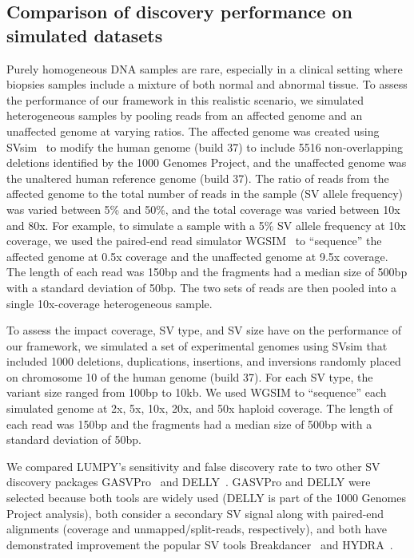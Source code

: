 \documentclass[10pt]{bmc_article}
\newenvironment{bmcformat}{\begin{raggedright}\baselineskip20pt\sloppy\setboolean{publ}{false}}{\end{raggedright}\baselineskip20pt\sloppy}
\begin{document}
\begin{bmcformat}
\subsection*{Comparison of discovery performance on simulated datasets}
Purely homogeneous DNA samples are rare, especially in a clinical setting where
biopsies samples include a mixture of both normal and abnormal tissue.  To
assess the performance of our framework in this realistic scenario, we simulated
heterogeneous samples by pooling reads from an affected genome and an unaffected
genome at varying ratios.  The affected genome was created using
SVsim~\cite{faustunpub} to modify the human genome (build 37) to include
5516 non-overlapping deletions identified by the 1000 Genomes Project, and the
unaffected genome was the unaltered human reference genome (build 37).  The
ratio of reads from the affected genome to the total number of reads in the
sample (SV allele frequency) was varied between 5\% and 50\%, and the total
coverage was varied between 10x and 80x.  For example, to simulate a sample with
a 5\% SV allele frequency at 10x coverage, we used the paired-end read simulator
WGSIM~\cite{liunpub} to “sequence” the affected genome at 0.5x coverage and the
unaffected genome at 9.5x coverage.  The length of each read was 150bp and the
fragments had a median size of 500bp with a standard deviation of 50bp.  The two
sets of reads are then pooled into a single 10x-coverage heterogeneous sample.

To assess the impact coverage, SV type, and SV size have on the performance of
our framework, we simulated a set of experimental genomes using SVsim that
included 1000 deletions, duplications, insertions, and inversions randomly
placed on chromosome 10 of the human genome (build 37).  For each SV type, 
the variant size ranged from 100bp to 10kb.  We used WGSIM to “sequence” each
simulated genome at 2x, 5x, 10x, 20x, and 50x haploid coverage.  The length of
each read was 150bp and the fragments had a median size of 500bp with a standard
deviation of 50bp.

We compared LUMPY’s sensitivity and false discovery rate to two other SV
discovery packages GASVPro~\cite{sindi2012} and DELLY~\cite{rausch2012b}.
GASVPro and DELLY were selected because both tools are widely used (DELLY is
part of the 1000 Genomes Project analysis), both consider a secondary SV signal
along with paired-end alignments (coverage and unmapped/split-reads,
respectively), and both have demonstrated improvement the popular SV tools
Breakdancer~\cite{chen2009} and HYDRA~\cite{quinlan2010b}. 



\end{bmcformat}
\end{document}
